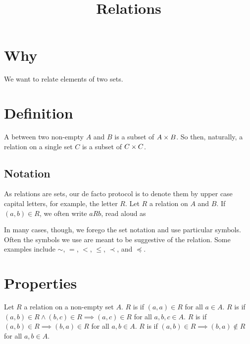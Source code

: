 







\title{Relations}

\section{Why}
We want to relate elements of two sets.


\section{Definition}

A  between two non-empty  $A$ and $B$ is a subset of $A \times B$.
So then, naturally, a relation on a single set $C$ is a subset of $C \times C$.

\subsection{Notation}
As relations are sets, our de facto protocol is to denote them by upper case capital letters, for example, the letter $R$.
Let $R$ a relation on $A$ and $B$.
If $(a, b) \in R$, we often write $a R b$, read aloud as 

In many cases, though, we forego the set notation and use particular symbols.
Often the symbols we use are meant to be suggestive of the relation.
Some examples include $\sim$, $=$, $<$, $\leq$, $\prec$, and $\preceq$.

\section{Properties}

Let $R$ a relation on a non-empty set $A$.
$R$ is  if $(a, a) \in R$ for all $a \in A$.
$R$ is  if $(a, b) \in R \land (b, c) \in R \implies (a, c) \in R$ for all $a, b, c \in A$.
$R$ is  if $(a, b) \in R \implies (b, a) \in R$ for all $a, b \in A$.
$R$ is  if $(a, b) \in R \implies (b, a) \not\in R$ for all $a, b \in A$.



